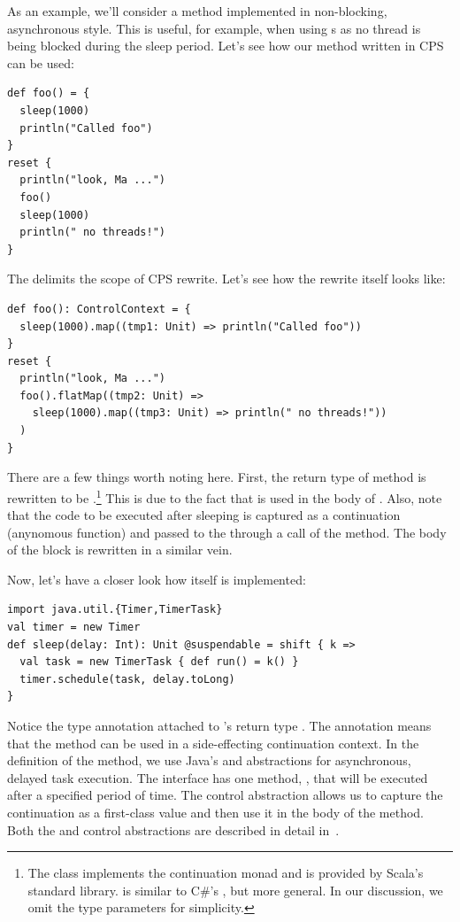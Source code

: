 \documentclass[runningheads,a4paper]{llncs}
\begin{document}
As an example, we'll consider a  method implemented in non-blocking, asynchronous style. This is useful, for example, when using s as no thread is being blocked during the sleep period. Let's see how our  method written in CPS can be used:

\begin{lstlisting}
def foo() = {
  sleep(1000)
  println("Called foo")
}
reset {
  println("look, Ma ...")
  foo()
  sleep(1000)
  println(" no threads!")
}
\end{lstlisting}

The  delimits the scope of CPS rewrite. Let's see how the rewrite itself looks like:

\begin{lstlisting}
def foo(): ControlContext = {
  sleep(1000).map((tmp1: Unit) => println("Called foo"))
}
reset {
  println("look, Ma ...")
  foo().flatMap((tmp2: Unit) =>
    sleep(1000).map((tmp3: Unit) => println(" no threads!"))
  )
}
\end{lstlisting}

There are a few things worth noting here. First, the return type of
 method is rewritten to be
.\footnote{The  class
  implements the continuation monad and is provided by Scala's
  standard library.  is similar to C\#'s
  , but more general. In our discussion, we omit the
  type parameters for simplicity.} This is due to the fact that
 is used in the body of . Also, note that the
code to be executed after sleeping is captured as a continuation
(anynomous function) and passed to the  through a
call of the  method. The body of the  block is
rewritten in a similar vein.

Now, let's have a closer look how  itself is implemented:

\begin{lstlisting}[label=code:cps_scala]
import java.util.{Timer,TimerTask}
val timer = new Timer
def sleep(delay: Int): Unit @suspendable = shift { k =>
  val task = new TimerTask { def run() = k() }
  timer.schedule(task, delay.toLong)
}
\end{lstlisting}

Notice the  type annotation attached to 's return type . The  annotation means that the  method can be used in a side-effecting continuation context. In the definition of the  method, we use Java's  and  abstractions for asynchronous, delayed task execution. The  interface has one method, , that will be executed after a specified period of time. The  control abstraction allows us to capture the continuation as a first-class value and then use it in the body of the  method. Both the  and  control abstractions are described in detail in~\cite{danvy90}.
\end{document}
